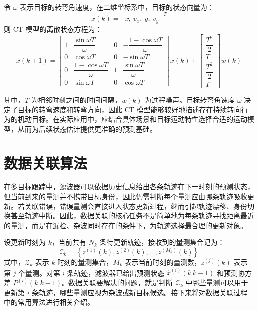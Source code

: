 \documentclass{xdupgthesis}
\begin{document}
令 $\omega$ 表示目标的转弯角速度，在二维坐标系中，目标的状态向量为：
\[
x(k)=[x,\ v_x,\ y,\ v_y]^T
\]
则 CT 模型的离散状态方程为：
\begin{equation}
	x(k+1)=
	\begin{bmatrix}
		1 & \dfrac{\sin \omega T}{\omega} & 0 & -\dfrac{1-\cos \omega T}{\omega}\\[8pt]
		0 & \cos \omega T & 0 & -\sin \omega T\\[6pt]
		0 & \dfrac{1-\cos \omega T}{\omega} & 1 & \dfrac{\sin \omega T}{\omega}\\[8pt]
		0 & \sin \omega T & 0 & \cos \omega T
	\end{bmatrix}
	x(k)
	+
	\begin{bmatrix}
		\dfrac{T^2}{2}\\
		T\\
		\dfrac{T^2}{2}\\
		T
	\end{bmatrix}
	w(k)
\end{equation}

其中，$T$ 为相邻时刻之间的时间间隔，$w(k)$ 为过程噪声。目标转弯角速度 $\omega$ 决定了目标的转弯速度和转弯方向，因此 CT 模型能够较好地描述存在持续转向行为的机动目标。在实际应用中，应结合具体场景和目标运动特性选择合适的运动模型，从而为后续状态估计提供更准确的预测基础。



\section{数据关联算法}\label{sec:orm}

在多目标跟踪中，滤波器可以依据历史信息给出各条轨迹在下一时刻的预测状态，但当前到来的量测并不携带目标身份，因此仍需判断每个量测应由哪条轨迹吸收更新。若关联错误，错误量测会直接进入状态更新过程，继而引起轨迹漂移、身份切换甚至轨迹中断。因此，数据关联的核心任务不是简单地为每条轨迹寻找距离最近的量测，而是在漏检、杂波同时存在的条件下，为轨迹选择最合理的更新对象。

设更新时刻为 $k$，当前共有 $N_k$ 条待更新轨迹，接收到的量测集合记为：
\begin{equation}
	\mathcal{Z}_k=
	\left\{
	z^{(1)}(k),z^{(2)}(k),\ldots,z^{(M_k)}(k)
	\right\}
\end{equation}
式中，$\mathcal{Z}_k$ 表示 $k$ 时刻的量测集合，$M_k$ 表示当前时刻的量测数，$z^{(j)}(k)$ 表示第 $j$ 个量测。对第 $i$ 条轨迹，滤波器已给出预测状态 $\hat{x}^{(i)}(k|k-1)$ 和预测协方差 $P^{(i)}(k|k-1)$。数据关联要解决的问题，就是判断 $\mathcal{Z}_k$ 中哪些量测可以用于更新第 $i$ 条轨迹，哪些量测应视为杂波或新目标候选。接下来将对数据关联过程中的常用算法进行相关介绍。
\end{document}
